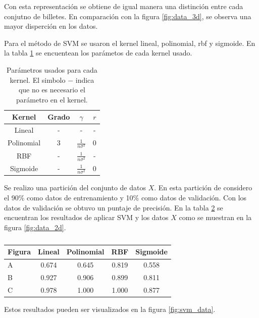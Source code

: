 Con esta representación se obtiene de igual manera una distinción entre cada conjutno de billetes. En comparación con la figura \ref{fig:data_3d}, se observa una mayor disperción en los datos.

Para el método de SVM se usaron el kernel lineal, polinomial, rbf y sigmoide. En la tabla \ref{table:parameters} se encuentean los parámetos de cada kernel usado.


\begin{table}[H]
    \centering
    \begin{tabular}{cccc} \hline
        Kernel     & Grado & $\gamma$              & $r$ \\ \hline
        Lineal     & -     & -                     & -   \\
        Polinomial & 3     & $\frac{1}{n\sigma^2}$ & 0   \\
        RBF        & -     & $\frac{1}{n\sigma^2}$ & -   \\
        Sigmoide   & -     & $\frac{1}{n\sigma^2}$ & 0   \\ \hline
    \end{tabular}
    \caption{Parámetros usados para cada kernel. El simbolo $-$ indica que no es necesario el parámetro en el kernel.}
    \label{table:parameters}
\end{table}


Se realizo una partición del conjunto de datos $X$. En esta partición de considero el 90\% como datos de entrenamiento y 10\% como datos de validación. Con los datos de validación se obtuvo un puntaje de precisión. En la tabla \ref{table:data_2d} se encuentran los resultados de aplicar SVM y los datos $X$ como se muestran en la figura \ref{fig:data_2d}.

\begin{table}[H]
    \centering
    \begin{tabular}{lcccc} \hline
        Figura & Lineal & Polinomial & RBF   & Sigmoide \\ \hline
        A      & 0.674  & 0.645      & 0.819 & 0.558    \\
        B      & 0.927  & 0.906      & 0.899 & 0.811    \\
        C      & 0.978  & 1.000      & 1.000 & 0.877    \\ \hline
    \end{tabular}
    \caption{}
    \label{table:data_2d}
\end{table}

Estos resultados pueden ser visualizados en la figura \ref{fig:svm_data}.

